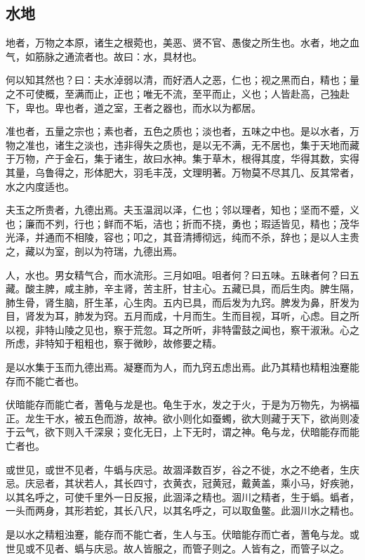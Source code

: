 \documentclass[]{article}
\begin{document}
\hypertarget{header-n546}{%
\subsection{水地}\label{header-n546}}

地者，万物之本原，诸生之根菀也，美恶、贤不官、愚俊之所生也。水者，地之血气，如筋脉之通流者也。故曰：水，具材也。

何以知其然也？曰：夫水淖弱以清，而好洒人之恶，仁也；视之黑而白，精也；量之不可使概，至满而止，正也；唯无不流，至平而止，义也；人皆赴高，己独赴下，卑也。卑也者，道之室，王者之器也，而水以为都居。

准也者，五量之宗也；素也者，五色之质也；淡也者，五味之中也。是以水者，万物之准也，诸生之淡也，违非得失之质也，是以无不满，无不居也，集于天地而藏于万物，产于金石，集于诸生，故曰水神。集于草木，根得其度，华得其数，实得其量，乌鲁得之，形体肥大，羽毛丰茂，文理明著。万物莫不尽其几、反其常者，水之内度适也。

夫玉之所贵者，九德出焉。夫玉温润以泽，仁也；邻以理者，知也；坚而不蹙，义也；廉而不刿，行也；鲜而不垢，洁也；折而不挠，勇也；瑕适皆见，精也；茂华光泽，并通而不相陵，容也；叩之，其音清搏彻远，纯而不杀，辞也；是以人主贵之，藏以为室，剖以为符瑞，九德出焉。

人，水也。男女精气合，而水流形。三月如咀。咀者何？曰五味。五昧者何？曰五藏。酸主脾，咸主肺，辛主肾，苦主肝，甘主心。五藏已具，而后生肉。脾生隔，肺生骨，肾生脑，肝生革，心生肉。五内已具，而后发为九窍。脾发为鼻，肝发为目，肾发为耳，肺发为窍。五月而成，十月而生。生而目视，耳听，心虑。目之所以视，非特山陵之见也，察于荒忽。耳之所听，非特雷鼓之闻也，察干淑湫。心之所虑，非特知于粗粗也，察于微眇，故修要之精。

是以水集于玉而九德出焉。凝蹇而为人，而九窍五虑出焉。此乃其精也精粗浊蹇能存而不能亡者也。

伏暗能存而能亡者，蓍龟与龙是也。龟生于水，发之于火，于是为万物先，为祸福正。龙生干水，被五色而游，故神。欲小则化如蚕蠋，欲大则藏于天下，欲尚则凌于云气，欲下则入千深泉；变化无日，上下无时，谓之神。龟与龙，伏暗能存而能亡者也。

或世见，或世不见者，牛蟡与庆忌。故涸泽数百岁，谷之不徙，水之不绝者，生庆忌。庆忌者，其状若人，其长四寸，衣黄衣，冠黄冠，戴黄盖，乘小马，好疾驰，以其名呼之，可使千里外一日反报，此涸泽之精也。涸川之精者，生于蟡。蟡者，一头而两身，其形若蛇，其长八尺，以其名呼之，可以取鱼鳖。此涸川水之精也。

是以水之精粗浊蹇，能存而不能亡者，生人与玉。伏暗能存而亡者，蓍龟与龙。或世见或不见者、蟡与庆忌。故人皆服之，而管子则之。人皆有之，而管子以之。
\end{document}
